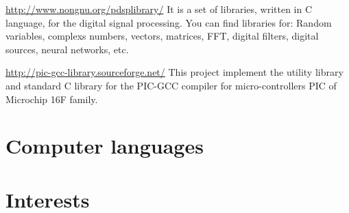 \documentclass[11pt,a4paper,sans]{moderncv} %
\begin{document}
			{\url{http://www.nongnu.org/pdsplibrary/}}
			{}{}
			{It is a set of libraries, written in C language, for 
			the digital signal processing. You can find libraries for:
			Random variables, complexs numbers, vectors, matrices, FFT,
			digital filters, digital sources, neural networks, etc.}

			{\url{http://pic-gcc-library.sourceforge.net/}}
			{}{}
			{This project implement the utility library and 
			standard C library for the PIC-GCC compiler for 
			micro-controllers PIC of Microchip 16F family. }


\section{Computer languages}



\section{Interests}

\renewcommand{\listitemsymbol}{-~} %
\end{document}
